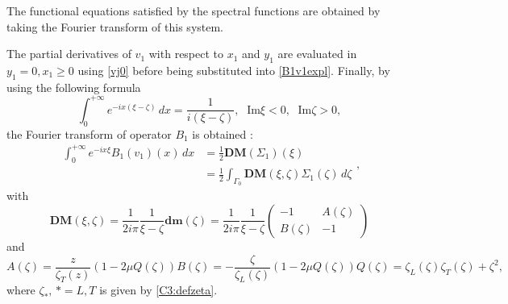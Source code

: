 The functional equations satisfied by the spectral functions are obtained by taking the Fourier transform of this system. 

The partial derivatives of $v_1$ with respect to $x_1$ and $y_1$ are evaluated in  $y_1=0, x_1 \geq 0$ using \eqref{vj0} before being substituted into \eqref{B1v1expl}. Finally, by using the following formula
$$\int_0^{+\infty} e^{-ix(\xi-\zeta)}\,dx=\frac{1}{i(\xi-\zeta)}, \; \mbox{ Im}\xi <0, \;  \mbox{ Im} \zeta>0, $$
the Fourier transform of operator $B_1$ is obtained :
\begin{equation}
\begin{split}
\int_0^{+\infty} e^{-ix\xi}B_1(v_1)(x)\,dx&=\frac{1}{2}\textbf{DM}(\Sigma_1)(\xi) \\
&=\frac{1}{2} \int_{\Gamma_0}\textbf{DM}(\xi,\zeta)\Sigma_1(\zeta)\,d\zeta
\end{split},
\label{B1DM}
\end{equation}
with
\begin{equation}
\textbf{DM}(\xi,\zeta)=\frac{1}{2i\pi} \frac{1}{\xi-\zeta} \textbf{dm}(\zeta) =\frac{1}{2i\pi} \frac{1}{\xi-\zeta} \begin{pmatrix}
-1 & A(\zeta) \\
B(\zeta) & -1
\end{pmatrix}
\label{defDM}
\end{equation}
and
\begin{subequations}
\begin{equation}
A(\zeta)=\frac{z}{\zeta_T(z)}(1-2\mu Q(\zeta))
\end{equation}
\begin{equation}
B(\zeta)=-\frac{\zeta}{\zeta_L(\zeta)}(1-2\mu Q(\zeta))
\end{equation}
\begin{equation}
Q(\zeta)=\zeta_L(\zeta) \zeta_T(\zeta)+\zeta^2,
\end{equation}
\end{subequations}
where $\zeta_*,\, *=L,T$ is given by \eqref{C3:defzeta}.

